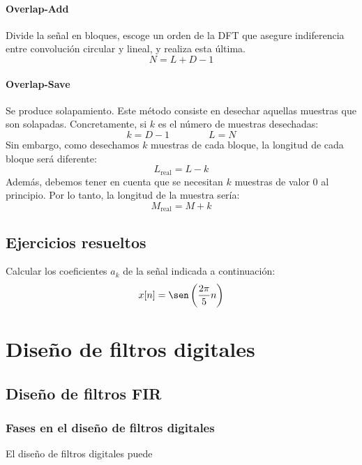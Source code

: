 \documentclass[a4paper,oneside]{book}
\begin{document}
\begin{multicols}{2}
	\subsubsection{Overlap-Add}
	Divide la señal en bloques, escoge un orden de la DFT que asegure indiferencia entre convolución circular y lineal, y realiza esta última.
	\[ N = L + D - 1 \]
	\vspace*{\fill}
	
\columnbreak
	\subsubsection{Overlap-Save}	
	Se produce solapamiento. Este método consiste en desechar aquellas muestras que son solapadas. Concretamente, si $k$ es el número de muestras desechadas:
	\[ k = D - 1 \qquad \qquad L = N \]
	Sin embargo, como desechamos $k$ muestras de cada bloque, la longitud de cada bloque será diferente:
	\[ L_\text{real} = L - k\]
	Además, debemos tener en cuenta que se necesitan $k$ muestras de valor 0 al principio. Por lo tanto, la longitud de la muestra sería:
	\[ M_\text{real} = M + k \]

	\vspace*{\fill}
\end{multicols}

\section{Ejercicios resueltos}


Calcular los coeficientes $a_k$ de la señal indicada a continuación: \[ x[n] = \sen \left( \frac{2\pi}{5}n \right) \]



\chapter{Diseño de filtros digitales} \label{temaDeFiltros}

\section{Diseño de filtros FIR}

\subsection{Fases en el diseño de filtros digitales}

El diseño de filtros digitales puede
\end{document}
